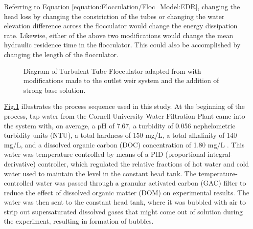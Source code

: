 \documentclass[letterpaper,10pt,english]{sphinxmanual}
\let\sphinxpxdimen\pdfpxdimen\else\newdimen\sphinxpxdimen
\begin{document}
Referring to Equation \eqref{equation:Flocculation/Floc_Model:EDR}, changing the head loss by changing the constriction of the tubes or changing the water elevation difference across the flocculator would change the energy dissipation rate. Likewise, either of the above two modifications would change the mean hydraulic residence time in the flocculator. This could also be accomplished by changing the length of the flocculator.

\begin{figure}[htbp]
\centering
\capstart

\noindent\sphinxincludegraphics[width=400\sphinxpxdimen]{{PennockFig1}.png}
\caption{Diagram of Turbulent Tube Flocculator adapted from \label{\detokenize{Flocculation/Floc_Model:id12}}{\hyperref[\detokenize{Flocculation/Floc_Model:floc-model-pennock-theoretical-2016}]{\sphinxcrossref{{[}PCWSL16{]}}}} with modifications made to the outlet weir system and the addition of strong base solution.}\label{\detokenize{Flocculation/Floc_Model:id38}}\label{\detokenize{Flocculation/Floc_Model:figure-apparatus}}\end{figure}

\hyperref[\detokenize{Flocculation/Floc_Model:figure-apparatus}]{Fig.\@ \ref{\detokenize{Flocculation/Floc_Model:figure-apparatus}}} illustrates the process sequence used in this study. At the beginning of the process, tap water from the Cornell University Water Filtration Plant came into the system with, on average, a pH of 7.67, a turbidity of 0.056 nephelometric turbidity units (NTU), a total hardness of 150 mg/L, a total alkalinity of 140 mg/L, and a dissolved organic carbon (DOC) concentration of 1.80 mg/L \label{\detokenize{Flocculation/Floc_Model:id13}}{\hyperref[\detokenize{Flocculation/Floc_Model:floc-model-bp-mws-drinking-2016}]{\sphinxcrossref{{[}BPMWSCIWSCUWS16{]}}}}. This water was temperature-controlled by means of a PID (proportional-integral-derivative) controller, which regulated the relative fractions of hot water and cold water used to maintain the level in the constant head tank. The temperature-controlled water was passed through a granular activated carbon (GAC) filter to reduce the effect of dissolved organic matter (DOM) on experimental results. The water was then sent to the constant head tank, where it was bubbled with air to strip out supersaturated dissolved gases that might come out of solution during the experiment, resulting in formation of bubbles.
\end{document}
